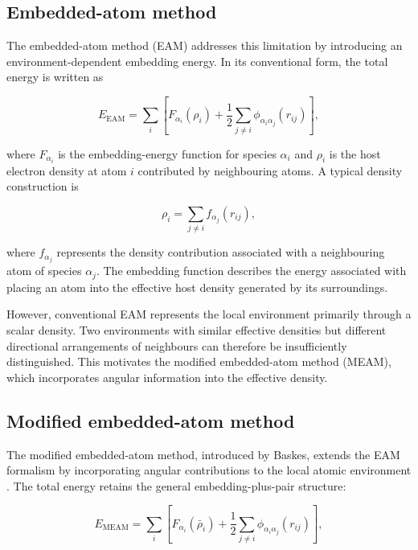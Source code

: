 \subsection{Embedded-atom method}

The embedded-atom method (EAM) addresses this limitation by introducing an 
environment-dependent embedding energy. In its conventional form, the total 
energy is written as

\begin{equation}
    E_{\mathrm{EAM}}
    = \sum_i \left[
        F_{\alpha_i}(\rho_i)
        + \frac{1}{2}\sum_{j\ne i}
        \phi_{\alpha_i\alpha_j}(r_{ij})
    \right],
    \label{eq:eam-energy}
\end{equation}

where $F_{\alpha_i}$ is the embedding-energy function for species $\alpha_i$ 
and $\rho_i$ is the host electron density at atom $i$ contributed by neighbouring 
atoms. A typical density construction is

\begin{equation}
    \rho_i =
    \sum_{j\ne i}
    f_{\alpha_j}(r_{ij}),
    \label{eq:eam-density}
\end{equation}

where $f_{\alpha_j}$ represents the density contribution associated with a 
neighbouring atom of species $\alpha_j$. The embedding function describes the 
energy associated with placing an atom into the effective host density generated 
by its surroundings.

However, conventional EAM represents the local environment primarily through a scalar 
density. Two environments with similar effective densities but different directional 
arrangements of neighbours can therefore be insufficiently distinguished. This motivates 
the modified embedded-atom method (MEAM), which incorporates angular information into the 
effective density.

\subsection{Modified embedded-atom method}

The modified embedded-atom method, introduced by Baskes, extends the EAM formalism by 
incorporating angular contributions to the local atomic environment \cite{baskes1992meam}. 
The total energy retains the general embedding-plus-pair structure:

\begin{equation}
    E_{\mathrm{MEAM}}
    = \sum_i \left[
        F_{\alpha_i}(\bar{\rho}_i)
        + \frac{1}{2}\sum_{j\ne i}
        \phi_{\alpha_i\alpha_j}(r_{ij})
    \right],
    \label{eq:meam-energy}
\end{equation}

